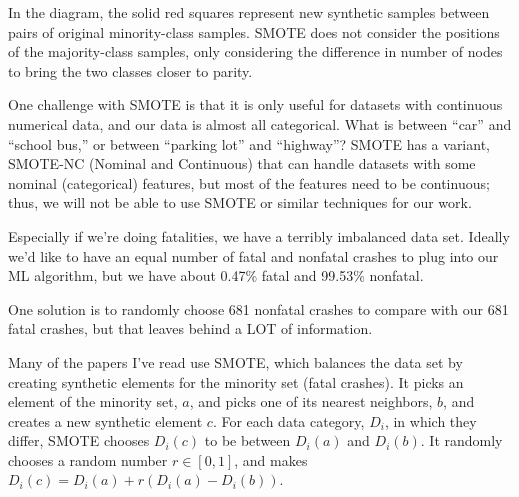 In the diagram, the solid red squares represent new synthetic samples between pairs of original minority-class samples.  SMOTE does not consider the positions of the majority-class samples, only considering the difference in number of nodes to bring the two classes closer to parity.  

\begin{center}
\end{center}

One challenge with SMOTE is that it is only useful for datasets with continuous numerical data, and our data is almost all categorical.  What is between ``car'' and ``school bus,'' or between ``parking lot'' and ``highway''?  SMOTE has a variant, SMOTE-NC (Nominal and Continuous) that can handle datasets with some nominal (categorical) features, but most of the features need to be continuous; thus, we will not be able to use SMOTE or similar techniques for our work.  


Especially if we're doing fatalities, we have a terribly imbalanced data set.  Ideally we'd like to have an equal number of fatal and nonfatal crashes to plug into our ML algorithm, but we have about 0.47\% fatal and 99.53\% nonfatal.  

One solution is to randomly choose 681 nonfatal crashes to compare with our 681 fatal crashes, but that leaves behind a LOT of information.  

Many of the papers I've read use SMOTE, which balances the data set by creating synthetic elements for the minority set (fatal crashes).  It picks an element of the minority set, $a$, and picks one of its nearest neighbors, $b$, and creates a new synthetic element $c$.  For each data category, $D_i$, in which they differ, SMOTE chooses $D_i(c)$ to be between $D_i(a)$ and $D_i(b)$.  It randomly chooses a random number $r \in [0,1]$, and makes $D_i(c) = D_i(a) + r(D_i(a) - D_i(b))$.  


